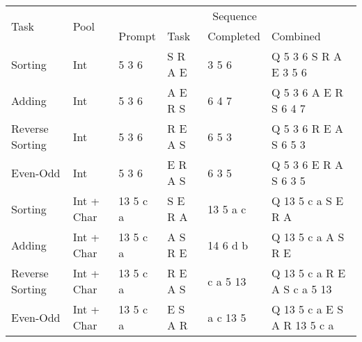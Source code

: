 \begin{tabular}{l l l l l l}
\toprule
\multirow{2}{*}{Task} & \multirow{2}{*}{Pool} & \multicolumn{4}{c}{Sequence} \\ \cmidrule(lr){3-6}
                      &                       & Prompt & Task & Completed & Combined \\
\midrule
Sorting & Int                     & 5 3 6      & S R A E    & 3 5 6         & Q 5 3 6 S R A E 3 5 6        \\
Adding  & Int                     & 5 3 6      & A E R S    & 6 4 7         & Q 5 3 6 A E R S 6 4 7        \\
Reverse Sorting  & Int                     & 5 3 6      & R E A S    & 6 5 3         & Q 5 3 6 R E A S 6 5 3        \\
Even-Odd  & Int                     & 5 3 6      &  E R A S    & 6 3 5         & Q 5 3 6 E R A S 6 3 5        \\
Sorting & Int + Char                     & 13 5 c a      & S E R A    & 13 5 a c & Q 13 5 c a S E R A        \\
Adding  & Int + Char                     & 13 5 c a      & A S R E    & 14 6 d b         & Q 13 5 c a A S R E        \\
Reverse Sorting  & Int + Char                     & 13 5 c a      & R E A S    & c a 5 13         & Q 13 5 c a R E A S c a 5 13        \\
Even-Odd  & Int + Char                     & 13 5 c a      & E S A R    & a c 13 5 & Q 13 5 c a E S A R 13 5 c a        \\

\bottomrule
\end{tabular}%
